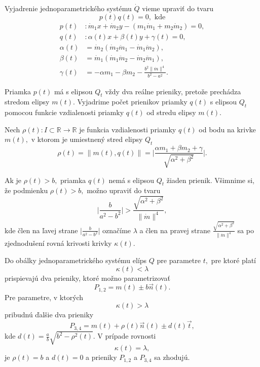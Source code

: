 Vyjadrenie jednoparametrického systému $\dot{Q}$ vieme upraviť do tvaru $$ p(t)q(t) = 0, \text{ kde} $$
\begin{align*}
p(t) &\colon \dot{m}_1 x + \dot{m}_2 y - (m_1 \dot{m}_1 + m_2 \dot{m}_2) = 0, \\
q(t) &\colon  \alpha(t) x + \beta(t) y +  \gamma(t) = 0, \\
\alpha (t) &= \dot{m}_2(\dot{m}_2 \ddot{m}_1 - \dot{m}_1 \ddot{m}_2) , \\
\beta (t) &= \dot{m}_1 (\dot{m}_1 \ddot{m}_2 - \dot{m}_2 \ddot{m}_1) , \\
\gamma (t) &= -\alpha m_1 - \beta m_2 - \frac{b^2 \| \dot{m} \|^4 }{b^2 - a^2}.
\end{align*}

Priamka $p(t)$ má s elipsou $Q_t$ vždy dva reálne prieniky, pretože prechádza stredom elipsy $m(t)$. Vyjadrime počet prienikov priamky $q(t)$ s elipsou $Q_t$ pomocou funkcie vzdialenosti priamky $q(t)$ od stredu elipsy $m(t).$

Nech $\rho(t) \colon I \subset \mathbb{R} \rightarrow \mathbb{R}$ je funkcia vzdialenosti priamky $q(t)$ od bodu na krivke $m(t),$ v ktorom je umiestnený stred elipsy $Q_t$
$$
\rho (t) = \| m(t), q(t) \|= \bigg|  \frac{\alpha m_1 + \beta m_2 + \gamma}{\sqrt{\alpha^2 + \beta^2}} \bigg|.
$$

Ak je $\rho(t) > b,$ priamka $q(t)$ nemá s elipsou  $Q_t$ žiaden prienik. Všimnime si, že podmienku $\rho(t) > b,$ možno upraviť do tvaru
$$
\bigg|  \frac{b}{a^2 - b^2} \bigg| > \frac{\sqrt{\alpha^2 + \beta^2}}{\| \dot{m} \|^4},
$$
kde člen na ľavej strane $\big| \frac{b}{a^2 - b^2} \big|$ označíme $\lambda$ a člen na pravej strane $\frac{\sqrt{\alpha^2 + \beta^2}}{\| \dot{m} \|^4} $ sa po zjednodušení rovná krivosti krivky $\kappa(t).$

Do obálky jednoparametrického systému elíps $Q$ pre parametre $t,$ pre ktoré platí 
$$
\kappa(t) < \lambda
$$
prispievajú dva prieniky, ktoré možno parametrizovať
$$P_{1,2}= m(t)\pm b \vec{n}(t).$$
Pre parametre, v ktorých
$$
\kappa(t) > \lambda
$$
pribudnú ďalšie dva prieniky
$$
P_{3,4} = m(t) + \rho(t) \vec{n}(t) \pm d(t) \vec{t},$$
kde $d(t)=\frac{a}{b} \sqrt{b^2 - \rho^2(t)}.$
V prípade rovnosti
$$
\kappa(t) = \lambda,
$$
je $\rho(t) = b$ a $d(t) = 0$  a prieniky $P_{1,2}$ a $P_{3,4}$ sa zhodujú.

